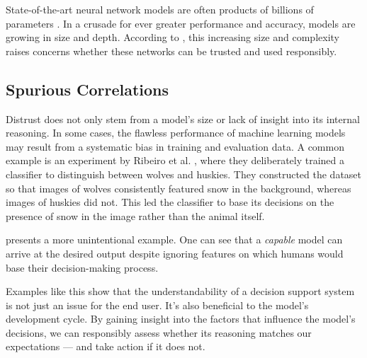 State-of-the-art neural network models are often products of billions of parameters \cite{arrieta-taxonomy}.
In a crusade for ever greater performance and accuracy, models are growing in size and depth.
According to \cite{arrieta-taxonomy, xai-survey}, this increasing size and complexity raises concerns whether these networks can be trusted and used responsibly.

\subsection*{Spurious Correlations}

Distrust does not only stem from a model's size or lack of insight into its internal reasoning.
In some cases, the flawless performance of machine learning models may result from a systematic bias in training and evaluation data.
A common example is an experiment by Ribeiro et al. \cite{xai-husky}, where they deliberately trained a classifier to distinguish between wolves and huskies.
They constructed the dataset so that images of wolves consistently featured snow in the background, whereas images of huskies did not.
This led the classifier to base its decisions on the presence of snow in the image rather than the animal itself. 

 presents a more unintentional example.
One can see that a \emph{capable} model can arrive at the desired output despite ignoring features on which humans would base their decision-making process. 

Examples like this show that the understandability of a decision support system is not just an issue for the end user.
It's also beneficial to the model's development cycle.
By gaining insight into the factors that influence the model's decisions, we can responsibly assess whether its reasoning matches our expectations --- and take action if it does not.

